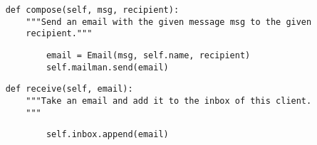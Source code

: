 \begin{lstlisting}
    def compose(self, msg, recipient):
        """Send an email with the given message msg to the given
        recipient."""
\end{lstlisting}
\begin{solution}[1in]
\begin{lstlisting}
            email = Email(msg, self.name, recipient)
            self.mailman.send(email)
\end{lstlisting}
\end{solution}

\begin{lstlisting}
    def receive(self, email):
        """Take an email and add it to the inbox of this client.
        """
\end{lstlisting}
\begin{solution}[1in]
\begin{lstlisting}
            self.inbox.append(email)
\end{lstlisting}
\end{solution}

\clearpage

